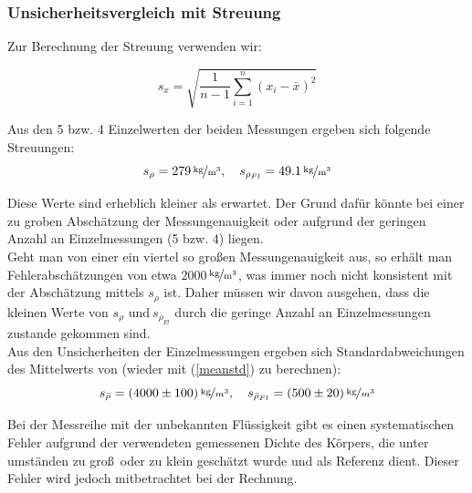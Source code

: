\documentclass[11pt,a4paper]{article}
\begin{document}

\subsubsection{Unsicherheitsvergleich mit Streuung}

Zur Berechnung der Streuung verwenden wir:

\begin{equation}
s_x=\sqrt{\frac{1}{n-1}\sum_{i=1}^n(x_i-\bar{x})^2}\label{streu}
\end{equation}

Aus den 5 bzw. 4 Einzelwerten der beiden Messungen ergeben sich folgende Streuungen:\\

$$s_\rho=279\, \mathrm{\nicefrac{\textrm{kg}}{m^3}},\quad s_{\rho_{Fl}}=49.1\, \mathrm{\nicefrac{\textrm{kg}}{m^3}}$$

Diese Werte sind erheblich kleiner als erwartet. Der Grund daf\"ur k\"onnte bei einer zu groben Absch\"atzung der Messungenauigkeit oder aufgrund der geringen Anzahl an Einzelmessungen (5 bzw. 4) liegen.\\

Geht man von einer ein viertel so gro\ss en Messungenauigkeit aus, so erh\"alt man Fehlerabsch\"atzungen von etwa 2000\,$\mathrm{\nicefrac{\textrm{kg}}{m^3}}$, was immer noch nicht konsistent mit der Absch\"atzung mittels $s_\rho$ ist. Daher m\"ussen wir davon ausgehen, dass die kleinen Werte von $s_\rho\textrm{ und}\ s_{\rho_{Fl}}$ durch die geringe Anzahl an Einzelmessungen zustande gekommen sind.\\

Aus den Unsicherheiten der Einzelmessungen ergeben sich Standardabweichungen des Mittelwerts von (wieder mit (\ref{meanstd}) zu berechnen):
\[
s_{\bar{\rho}}=(4000\pm100)\,\nicefrac{\textrm{kg}}{m^3},\quad
s_{\bar{\rho}_{Fl}}=(500\pm20)\,\nicefrac{\textrm{kg}}{m^3}
\]

Bei der Messreihe mit der unbekannten Fl\"ussigkeit gibt es einen systematischen Fehler aufgrund der verwendeten gemessenen Dichte des K\"orpers, die unter umst\"anden zu gro\ss\ oder zu klein gesch\"atzt wurde und als Referenz dient. Dieser Fehler wird jedoch mitbetrachtet bei der Rechnung.
\pagebreak
\end{document}
